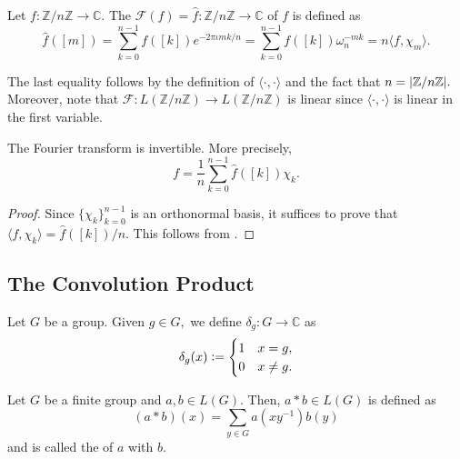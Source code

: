 \begin{defn} \label{defn:fourierZnZ}
    Let $f : \mathbb{Z}/n\mathbb{Z} \to \mathbb{C}.$ The  $\mathcal{F}(f) = \widehat{f} : \mathbb{Z}/n\mathbb{Z} \to \mathbb{C}$ of $f$ is defined as
    \begin{equation} \label{eq:013}
        \widehat{f}([m]) = \sum_{k = 0}^{n - 1} f([k])e^{-2\pi\iota mk/n} = \sum_{k = 0}^{n - 1} f([k])\omega_n^{-mk} = n\langle f, \chi_m\rangle.
    \end{equation}
\end{defn}

The last equality follows by the definition of $\langle \cdot , \cdot\rangle$ and the fact that $n = {\left\lvert \mathbb{Z}/n\mathbb{Z} \right\lvert}.$ Moreover, note that $\mathcal{F} : L(\mathbb{Z}/n\mathbb{Z}) \to L(\mathbb{Z}/n\mathbb{Z})$ is linear since
$\langle \cdot , \cdot\rangle$ is linear in the first variable.

\begin{prop}
    The Fourier transform is invertible. More precisely, 
    \begin{equation*}
        f = \frac{1}{n}\sum_{k = 0}^{n - 1} \widehat{f}([k])\chi_k.
    \end{equation*}
\end{prop}
\begin{proof}
    Since $\{\chi_{k}\}_{k = 0}^{n - 1}$ is an orthonormal basis, it suffices to prove that $\langle f, \chi_{k}\rangle = \widehat{f}([k])/n$. This follows from .
\end{proof}

\subsection{The Convolution Product}

\begin{defn}
    Let $G$ be a group.
    Given $g \in G,$ we define $\delta_g : G \to \mathbb{C}$ as
    \begin{equation*}
        \delta_g(x) \vcentcolon=
        \begin{cases}
            1 & x = g, \\
            0 & x \neq g.
        \end{cases}
    \end{equation*}
\end{defn}

\begin{defn}
    Let $G$ be a finite group and $a, b \in L(G).$ Then, $a * b \in L(G)$ is defined as
    \begin{equation*}
        (a * b)(x) = \sum_{y \in G} a(xy^{-1})b(y)
    \end{equation*}
    and is called the  of $a$ with $b.$
\end{defn}


